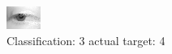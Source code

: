 \begin{figure}[h!]
\begin{center}
\includegraphics[width=0.60\columnwidth]{figures/ID2656_class_3_target_4.png}
\end{center}
\caption{ Classification: 3 actual target: 4}
\label{fig:ID2656_class_3_target_4}
\end{figure}
